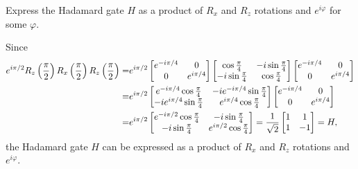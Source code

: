 \documentclass[en]{sol-man}
\begin{document}
\begin{exe}
    Express the Hadamard gate $H$ as a product of $R_x$ and $R_z$ rotations and $e^{i\varphi}$ for some $\varphi$.
\end{exe}
\begin{pf}
    Since
    \begin{align}
        \notag e^{i\pi/2}R_z\left(\frac{\pi}{2}\right)R_x\left(\frac{\pi}{2}\right)R_z\left(\frac{\pi}{2}\right)=&e^{i\pi/2}\left[\begin{matrix}
            e^{-i\pi/4}&0\\
            0&e^{i\pi/4}
        \end{matrix}\right]\left[\begin{matrix}
            \cos\frac{\pi}{4}&-i\sin\frac{\pi}{4}\\
            -i\sin\frac{\pi}{4}&\cos\frac{\pi}{4}
        \end{matrix}\right]\left[\begin{matrix}
            e^{-i\pi/4}&0\\
            0&e^{i\pi/4}
        \end{matrix}\right]\\
        \notag=&e^{i\pi/2}\left[\begin{matrix}
            e^{-i\pi/4}\cos\frac{\pi}{4}&-ie^{-i\pi/4}\sin\frac{\pi}{4}\\
            -ie^{i\pi/4}\sin\frac{\pi}{4}&e^{i\pi/4}\cos\frac{\pi}{4}
        \end{matrix}\right]\left[\begin{matrix}
            e^{-i\pi/4}&0\\
            0&e^{i\pi/4}
        \end{matrix}\right]\\
        \notag=&e^{i\pi/2}\left[\begin{matrix}
            e^{-i\pi/2}\cos\frac{\pi}{4}&-i\sin\frac{\pi}{4}\\
            -i\sin\frac{\pi}{4}&e^{i\pi/2}\cos\frac{\pi}{4}
        \end{matrix}\right]=\frac{1}{\sqrt{2}}\left[\begin{matrix}
            1&1\\
            1&-1
        \end{matrix}\right]=H,
    \end{align}
    the Hadamard gate $H$ can be expressed as a product of $R_x$ and $R_z$ rotations and $e^{i\varphi}$.
\end{pf}
\end{document}
